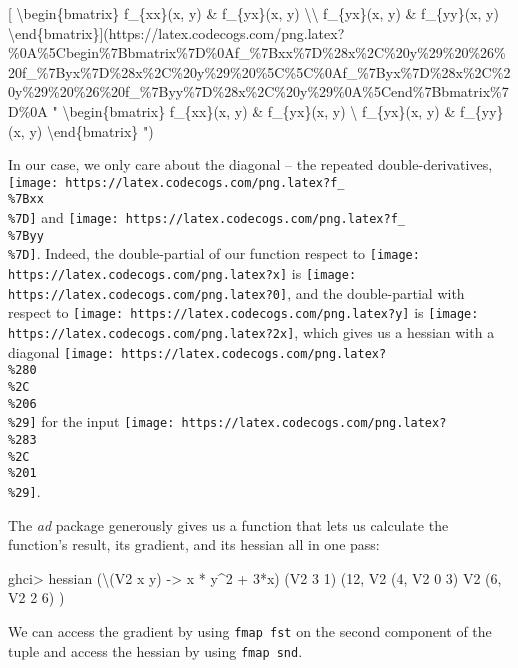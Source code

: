 \documentclass[]{article}
\newenvironment{Shaded}{}{}
\newcommand{\DataTypeTok}[1]{\textcolor[rgb]{0.56,0.13,0.00}{#1}}
\newcommand{\DecValTok}[1]{\textcolor[rgb]{0.25,0.63,0.44}{#1}}
\newcommand{\NormalTok}[1]{#1}
\newcommand{\OperatorTok}[1]{\textcolor[rgb]{0.40,0.40,0.40}{#1}}
\newcommand{\OtherTok}[1]{\textcolor[rgb]{0.00,0.44,0.13}{#1}}
\begin{document}
{[} \textbackslash begin\{bmatrix\} f\_\{xx\}(x, y) \& f\_\{yx\}(x, y)
\textbackslash\textbackslash{} f\_\{yx\}(x, y) \& f\_\{yy\}(x, y)
\textbackslash end\{bmatrix\}{]}(https://latex.codecogs.com/png.latex?\%0A\%5Cbegin\%7Bbmatrix\%7D\%0Af\_\%7Bxx\%7D\%28x\%2C\%20y\%29\%20\%26\%20f\_\%7Byx\%7D\%28x\%2C\%20y\%29\%20\%5C\%5C\%0Af\_\%7Byx\%7D\%28x\%2C\%20y\%29\%20\%26\%20f\_\%7Byy\%7D\%28x\%2C\%20y\%29\%0A\%5Cend\%7Bbmatrix\%7D\%0A
" \textbackslash begin\{bmatrix\} f\_\{xx\}(x, y) \& f\_\{yx\}(x, y)
\textbackslash{} f\_\{yx\}(x, y) \& f\_\{yy\}(x, y)
\textbackslash end\{bmatrix\} ")

In our case, we only care about the diagonal -- the repeated double-derivatives,
\texttt{[image: https://latex.codecogs.com/png.latex?f\_\\\%7Bxx\\\%7D]} and
\texttt{[image: https://latex.codecogs.com/png.latex?f\_\\\%7Byy\\\%7D]}. Indeed, the
double-partial of our function respect to
\texttt{[image: https://latex.codecogs.com/png.latex?x]} is
\texttt{[image: https://latex.codecogs.com/png.latex?0]}, and the double-partial
with respect to \texttt{[image: https://latex.codecogs.com/png.latex?y]} is
\texttt{[image: https://latex.codecogs.com/png.latex?2x]}, which gives us a
hessian with a diagonal
\texttt{[image: https://latex.codecogs.com/png.latex?\\\%280\\\%2C\\\%206\\\%29]} for
the input
\texttt{[image: https://latex.codecogs.com/png.latex?\\\%283\\\%2C\\\%201\\\%29]}.

The \emph{ad} package generously gives us a function that lets us calculate the
function's result, its gradient, and its hessian all in one pass:

\begin{Shaded}
\begin{Highlighting}[]
\NormalTok{ghci}\OperatorTok{>}\NormalTok{ hessian\textquotesingle{} (\textbackslash{}(}\DataTypeTok{V2}\NormalTok{ x y) }\OtherTok{{-}>}\NormalTok{ x }\OperatorTok{*}\NormalTok{ y}\OperatorTok{\^{}}\DecValTok{2} \OperatorTok{+} \DecValTok{3}\OperatorTok{*}\NormalTok{x) (}\DataTypeTok{V2} \DecValTok{3} \DecValTok{1}\NormalTok{)}
\NormalTok{(}\DecValTok{12}\NormalTok{, }\DataTypeTok{V2}\NormalTok{ (}\DecValTok{4}\NormalTok{, }\DataTypeTok{V2} \DecValTok{0} \DecValTok{3}\NormalTok{)}
     \DataTypeTok{V2}\NormalTok{ (}\DecValTok{6}\NormalTok{, }\DataTypeTok{V2} \DecValTok{2} \DecValTok{6}\NormalTok{)}
\NormalTok{)}
\end{Highlighting}
\end{Shaded}

We can access the gradient by using \texttt{fmap\ fst} on the second component
of the tuple and access the hessian by using \texttt{fmap\ snd}.
\end{document}
